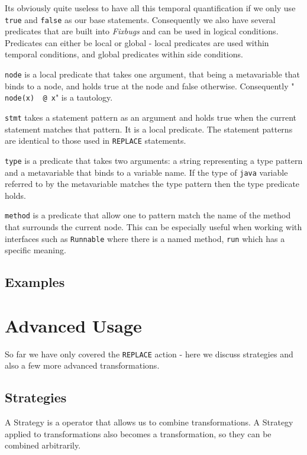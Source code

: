 \documentclass[final,twoside,12pt]{article}
\newcommand{\fixbugs}{{\emph{Fixbugs} }}
\newcommand{\java}{{\tt java} }
\begin{document}
Its obviously quite useless to have all this temporal quantification if we only use {\tt true} and {\tt false} as
our base statements.  Consequently we also have several predicates that are built into \fixbugs and can be used
in logical conditions.  Predicates can either be local or global - local predicates are used within temporal conditions,
and global predicates within side conditions.

{\tt node} is a local predicate that takes one argument, that being a metavariable that binds to a node, and
holds true at the node and false otherwise.  Consequently "{\tt { node(x) } @ x}" is a tautology.

{\tt stmt} takes a statement pattern as an argument and holds true when the current statement matches that pattern.
It is a local predicate.  The statement patterns are identical to those used in {\tt REPLACE} statements.

{\tt type} is a predicate that takes two arguments: a string representing a type pattern and a metavariable that binds to
a variable name.  If the type of \java variable referred to by the metavariable matches the type pattern then the type
predicate holds.

{\tt method} is a predicate that allow one to pattern match the name of the method that surrounds the current node.  This
can be especially useful when working with interfaces such as {\tt Runnable} where there is a named method, {\tt run} which
has a specific meaning.

\subsection{Examples}
\label{sec:side-egs}

\section{Advanced Usage}

So far we have only covered the {\tt REPLACE} action - here we discuss strategies and also a few more advanced transformations.

\subsection{Strategies}

A Strategy is a operator that allows us to combine transformations.  A Strategy applied to transformations also becomes a
transformation, so they can be combined arbitrarily.
\end{document}
